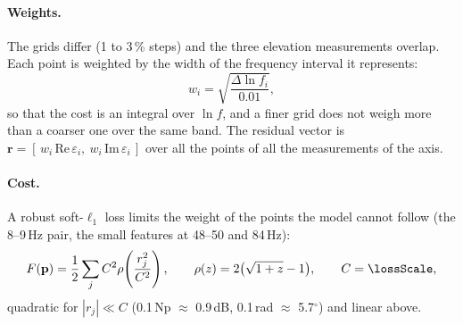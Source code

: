 \documentclass[10pt,a4paper]{article}
\numberwithin{equation}{section}
\begin{document}
\paragraph{Weights.} The grids differ (1 to 3\,\% steps) and the three elevation measurements overlap. Each point is weighted by the width of the frequency interval it represents:
\begin{equation}
w_i=\sqrt{\frac{\Delta\ln f_i}{0.01}},
\end{equation}
so that the cost is an integral over $\ln f$, and a finer grid does not weigh more than a coarser one over the same band. The residual vector is $\mathbf r=[\,w_i\,\mathrm{Re}\,\varepsilon_i,\ w_i\,\mathrm{Im}\,\varepsilon_i\,]$ over all the points of all the measurements of the axis.

\paragraph{Cost.} A robust soft-$\ell_1$ loss limits the weight of the points the model cannot follow (the 8--9\,Hz pair, the small features at 48--50 and 84\,Hz):
\begin{equation}
F(\mathbf p)=\frac12\sum_j C^2\rho\!\left(\frac{r_j^2}{C^2}\right),\qquad \rho(z)=2\bigl(\sqrt{1+z}-1\bigr),\qquad C=\lossScale ,
\end{equation}
quadratic for $|r_j|\ll C$ (0.1\,Np $\approx$ 0.9\,dB, 0.1\,rad $\approx$ 5.7$^\circ$) and linear above.
\end{document}
